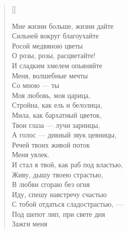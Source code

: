 \newpage
\vspace*{0cm}


\settowidth{\versewidth}{Мне жизни больше, жизни дайте\ldotse}
\begin{verse}[\versewidth]
\begin{patverse*}
Мне жизни больше, жизни дайте\ldotse\\
Сильней вокруг благоухайте\\
    Росой медвяною цветы\ldotse\\
О розы, розы, расцветайте!\\
И сладким хмелем опьяняйте\\
    Меня, волшебные мечты\ldotst\\
		Со мною --- ты\ldotst\\
Моя любовь, моя царица,\\
Стройна, как ель и белолица,\\
    Мила, как бархатный цветок,\\
Твои глаза --- лучи зарницы,\\
А голос --- дивный звук цевницы,\\
    Речей твоих живой поток\\
        Меня увлек.\\
И стал я твой, как раб под властью,\\
Живу, дышу твоею страстью,\\
    В любви сгораю без огня\ldotst\\
Иду, спешу навстречу счастью\\
С тобой отдаться сладострастью, ---\\
    Под шепот лип, при свете дня\ldotst\\
        Зажги меня\ldotst
\end{patverse*}
\end{verse}

\newpage
\vspace*{-2.5cm}


